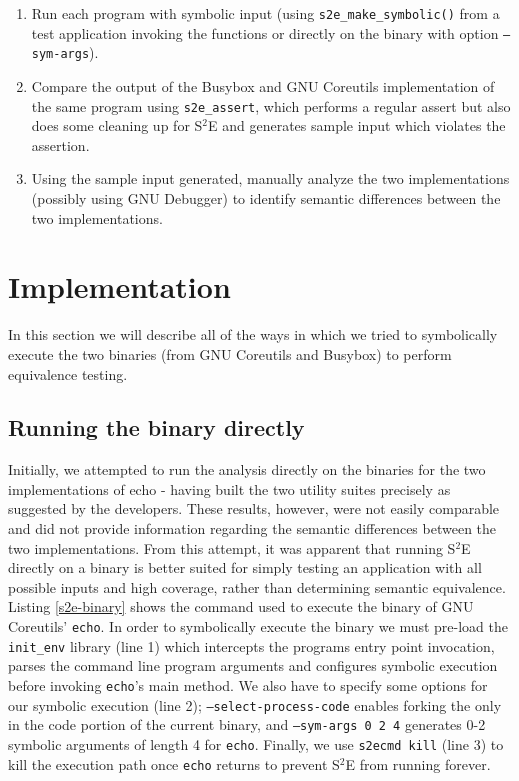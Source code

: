 \documentclass[conference]{IEEEtran}
\begin{document}
\begin{enumerate}
  \item Run each program with symbolic input (using {\tt s2e\_make\_symbolic()} from a test application invoking the functions or directly on the binary with option {\tt --sym-args}).
  \item Compare the output of the Busybox and GNU Coreutils implementation of the same program using {\tt s2e\_assert}, which performs a regular assert but also does some cleaning up for S$^2$E and generates sample input which violates the assertion.
  \item Using the sample input generated, manually analyze the two implementations (possibly using GNU Debugger) to identify semantic differences between the two implementations. 
\end{enumerate}


\section{Implementation}

In this section we will describe all of the ways in which we tried to symbolically execute the two binaries (from GNU Coreutils and Busybox) to perform equivalence testing. 

\subsection{Running the binary directly}

Initially, we attempted to run the analysis directly on the binaries for the two implementations of echo - having built the two utility suites precisely as suggested by the developers. These results, however, were not easily comparable and did not provide information regarding the semantic differences between the two implementations. From this attempt, it was apparent that running S$^2$E directly on a binary is better suited for simply testing an application with all possible inputs and high coverage, rather than determining semantic equivalence. \\

Listing \ref{s2e-binary} shows the command used to execute the binary of GNU Coreutils' {\tt echo}. In order to symbolically execute the binary we must pre-load the {\tt init\_env} library (line 1) which intercepts the programs entry point invocation, parses the command line program arguments and configures symbolic execution before invoking {\tt echo}'s main method. We also have to specify some options for our symbolic execution (line 2); {\tt --select-process-code} enables forking the only in the code portion of the current binary, and {\tt --sym-args 0 2 4} generates 0-2 symbolic arguments of length 4 for {\tt echo}. Finally, we use {\tt s2ecmd kill} (line 3) to kill the execution path once {\tt echo} returns to prevent S$^2$E from running forever. \\
\end{document}
